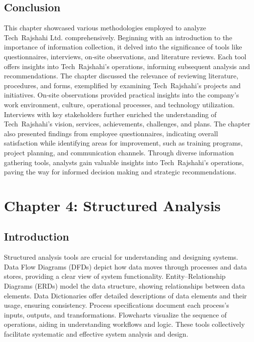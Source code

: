 \documentclass[12pt,a4paper]{article}
\begin{document}
\subsection{Conclusion}
This chapter showcased various methodologies employed to analyze Tech Rajshahi Ltd. comprehensively.  Beginning with an introduction to the importance of information collection, it delved into the significance of tools like questionnaires, interviews, on‑site observations, and literature reviews.  Each tool offers insights into Tech Rajshahi’s operations, informing subsequent analysis and recommendations.  The chapter discussed the relevance of reviewing literature, procedures, and forms, exemplified by examining Tech Rajshahi’s projects and initiatives.  On‑site observations provided practical insights into the company’s work environment, culture, operational processes, and technology utilization.  Interviews with key stakeholders further enriched the understanding of Tech Rajshahi’s vision, services, achievements, challenges, and plans.  The chapter also presented findings from employee questionnaires, indicating overall satisfaction while identifying areas for improvement, such as training programs, project planning, and communication channels.  Through diverse information gathering tools, analysts gain valuable insights into Tech Rajshahi’s operations, paving the way for informed decision making and strategic recommendations.

\newpage

\section{Chapter 4: Structured Analysis}

\subsection{Introduction}
Structured analysis tools are crucial for understanding and designing systems.  Data Flow Diagrams (DFDs) depict how data moves through processes and data stores, providing a clear view of system functionality.  Entity–Relationship Diagrams (ERDs) model the data structure, showing relationships between data elements.  Data Dictionaries offer detailed descriptions of data elements and their usage, ensuring consistency.  Process specifications document each process’s inputs, outputs, and transformations.  Flowcharts visualize the sequence of operations, aiding in understanding workflows and logic.  These tools collectively facilitate systematic and effective system analysis and design.
\end{document}
